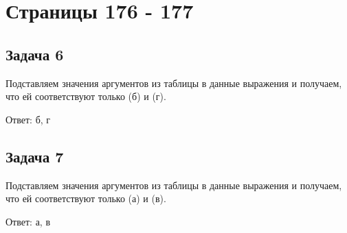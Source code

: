 \section{Страницы 176 - 177}




\subsection{Задача 6}
Подставляем значения аргументов из таблицы в данные выражения 
и получаем, что ей соответствуют только (б) и (г).

Ответ: б, г


\subsection{Задача 7}
Подставляем значения аргументов из таблицы в данные выражения 
и получаем, что ей соответствуют только (а) и (в).

Ответ: а, в

